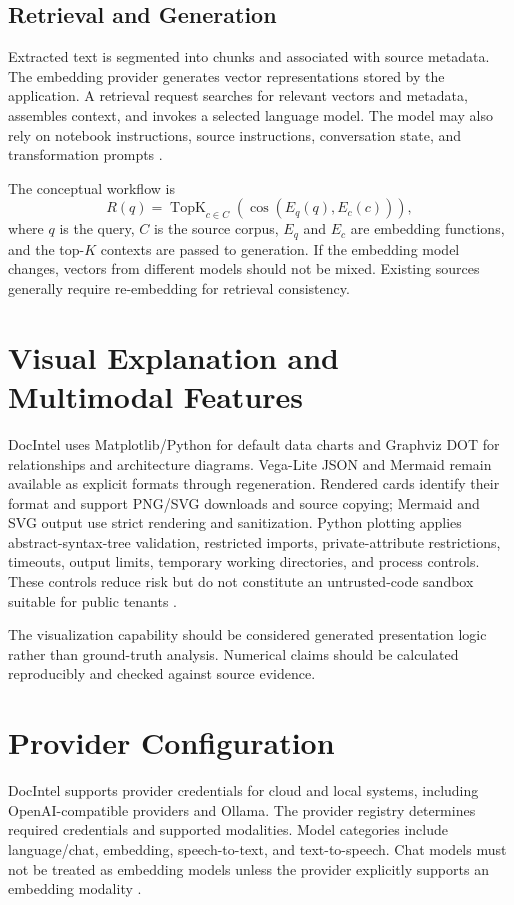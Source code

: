 \documentclass[conference]{IEEEtran}
\begin{document}
\subsection{Retrieval and Generation}
Extracted text is segmented into chunks and associated with source metadata. The embedding provider generates vector representations stored by the application. A retrieval request searches for relevant vectors and metadata, assembles context, and invokes a selected language model. The model may also rely on notebook instructions, source instructions, conversation state, and transformation prompts \cite{docintel}.

The conceptual workflow is
\begin{equation}
 R(q)=\operatorname{TopK}_{c \in C}\left(\cos(E_q(q),E_c(c))\right),
\end{equation}
where $q$ is the query, $C$ is the source corpus, $E_q$ and $E_c$ are embedding functions, and the top-$K$ contexts are passed to generation. If the embedding model changes, vectors from different models should not be mixed. Existing sources generally require re-embedding for retrieval consistency.

\section{Visual Explanation and Multimodal Features}
DocIntel uses Matplotlib/Python for default data charts and Graphviz DOT for relationships and architecture diagrams. Vega-Lite JSON and Mermaid remain available as explicit formats through regeneration. Rendered cards identify their format and support PNG/SVG downloads and source copying; Mermaid and SVG output use strict rendering and sanitization. Python plotting applies abstract-syntax-tree validation, restricted imports, private-attribute restrictions, timeouts, output limits, temporary working directories, and process controls. These controls reduce risk but do not constitute an untrusted-code sandbox suitable for public tenants \cite{docintel}.

The visualization capability should be considered generated presentation logic rather than ground-truth analysis. Numerical claims should be calculated reproducibly and checked against source evidence.

\section{Provider Configuration}
DocIntel supports provider credentials for cloud and local systems, including OpenAI-compatible providers and Ollama. The provider registry determines required credentials and supported modalities. Model categories include language/chat, embedding, speech-to-text, and text-to-speech. Chat models must not be treated as embedding models unless the provider explicitly supports an embedding modality \cite{docintel,ollama}.
\end{document}
